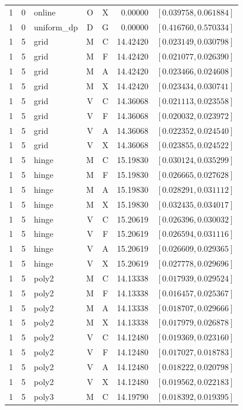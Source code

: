 \begin{longtable}{r r l c c r l}
1 & 0 & online & O & X & 0.00000 & $[0.039758,0.061884]$ \\
1 & 0 & uniform\_dp & D & G & 0.00000 & $[0.416760,0.570334]$ \\
1 & 5 & grid & M & C & 14.42420 & $[0.023149,0.030798]$ \\
1 & 5 & grid & M & F & 14.42420 & $[0.021077,0.026390]$ \\
1 & 5 & grid & M & A & 14.42420 & $[0.023466,0.024608]$ \\
1 & 5 & grid & M & X & 14.42420 & $[0.023434,0.030741]$ \\
1 & 5 & grid & V & C & 14.36068 & $[0.021113,0.023558]$ \\
1 & 5 & grid & V & F & 14.36068 & $[0.020032,0.023972]$ \\
1 & 5 & grid & V & A & 14.36068 & $[0.022352,0.024540]$ \\
1 & 5 & grid & V & X & 14.36068 & $[0.023855,0.024522]$ \\
1 & 5 & hinge & M & C & 15.19830 & $[0.030124,0.035299]$ \\
1 & 5 & hinge & M & F & 15.19830 & $[0.026665,0.027628]$ \\
1 & 5 & hinge & M & A & 15.19830 & $[0.028291,0.031112]$ \\
1 & 5 & hinge & M & X & 15.19830 & $[0.032435,0.034017]$ \\
1 & 5 & hinge & V & C & 15.20619 & $[0.026396,0.030032]$ \\
1 & 5 & hinge & V & F & 15.20619 & $[0.026594,0.031116]$ \\
1 & 5 & hinge & V & A & 15.20619 & $[0.026609,0.029365]$ \\
1 & 5 & hinge & V & X & 15.20619 & $[0.027778,0.029696]$ \\
1 & 5 & poly2 & M & C & 14.13338 & $[0.017939,0.029524]$ \\
1 & 5 & poly2 & M & F & 14.13338 & $[0.016457,0.025367]$ \\
1 & 5 & poly2 & M & A & 14.13338 & $[0.018707,0.029666]$ \\
1 & 5 & poly2 & M & X & 14.13338 & $[0.017979,0.026878]$ \\
1 & 5 & poly2 & V & C & 14.12480 & $[0.019369,0.023160]$ \\
1 & 5 & poly2 & V & F & 14.12480 & $[0.017027,0.018783]$ \\
1 & 5 & poly2 & V & A & 14.12480 & $[0.018222,0.020798]$ \\
1 & 5 & poly2 & V & X & 14.12480 & $[0.019562,0.022183]$ \\
1 & 5 & poly3 & M & C & 14.19790 & $[0.018392,0.019395]$ \\

\end{longtable}

